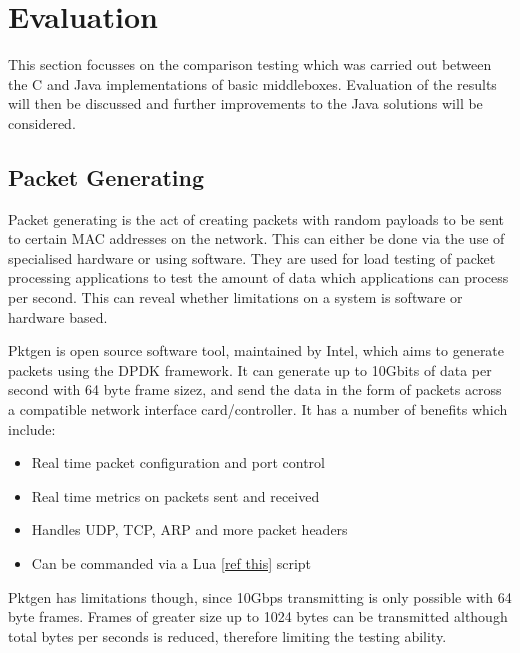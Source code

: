 \documentclass[final_report.tex]{subfiles}
\begin{document}
\section{Evaluation}

This section focusses on the comparison testing which was carried out between the C and Java implementations of basic middleboxes. Evaluation of the results will then be discussed and further improvements to the Java solutions will be considered.  

\subsection{Packet Generating}
Packet generating is the act of creating packets with random payloads to be sent to certain MAC addresses on the network. This can either be done via the use of specialised hardware or using software. They are used for load testing of packet processing applications to test the amount of data which applications can process per second. This can reveal whether limitations on a system is software or hardware based.


Pktgen is open source software tool, maintained by Intel, which aims to generate packets using the DPDK framework. It can generate up to 10Gbits of data per second with 64 byte frame sizez, and send the data in the form of packets across a compatible network interface card/controller. It has a number of benefits which include:

\begin{itemize}
	\item Real time packet configuration and port control
	\item Real time metrics on packets sent and received
	\item Handles UDP, TCP, ARP and more packet headers
	\item Can be commanded via a Lua \ref{ref this} script
\end{itemize}


Pktgen has limitations though, since 10Gbps transmitting is only possible with 64 byte frames. Frames of greater size up to 1024 bytes can be transmitted although total bytes per seconds is reduced, therefore limiting the testing ability. 
\end{document}
